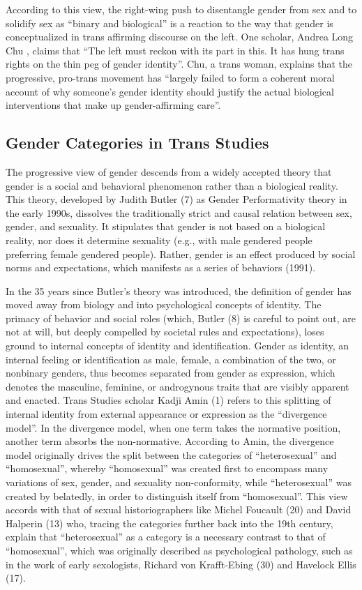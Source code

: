 \documentclass[11pt]{article}
\begin{document}
According to this view, the right-wing push to disentangle gender from sex and to solidify sex as “binary and biological” is a reaction to the way that gender is conceptualized in trans affirming discourse on the left. One scholar, Andrea Long Chu \citet{chu:2024}, claims that “The left must reckon with its part in this. It has hung trans rights on the thin peg of gender identity”. Chu, a trans woman, explains that the progressive, pro-trans movement has “largely failed to form a coherent moral account of why someone’s gender identity should justify the actual biological interventions that make up gender-affirming care”.

\subsection{Gender Categories in Trans Studies}
The progressive view of gender descends from a widely accepted theory that gender is a social and behavioral phenomenon rather than a biological reality. This theory, developed by Judith Butler (7) as Gender Performativity theory in the early 1990s, dissolves the traditionally strict and causal relation between sex, gender, and sexuality. It stipulates that gender is not based on a biological reality, nor does it determine sexuality (e.g., with male gendered people preferring female gendered people). Rather, gender is an effect produced by social norms and expectations, which manifests as a series of behaviors (1991).

In the 35 years since Butler’s theory was introduced, the definition of gender has moved away from biology and into psychological concepts of identity. The primacy of behavior and social roles (which, Butler (8) is careful to point out, are not at will, but deeply compelled by societal rules and expectations), loses ground to internal concepts of identity and identification. Gender as identity, an internal feeling or identification as male, female, a combination of the two, or nonbinary genders, thus becomes separated from gender as expression, which denotes the masculine, feminine, or androgynous traits that are visibly apparent and enacted. Trans Studies scholar Kadji Amin (1) refers to this splitting of internal identity from external appearance or expression as the “divergence model”.  In the divergence model, when one term takes the normative position, another term absorbs the non-normative. According to Amin, the divergence model originally drives the split between the categories of “heterosexual” and “homosexual”, whereby “homosexual” was created first to encompass many variations of sex, gender, and sexuality non-conformity, while “heterosexual” was created by belatedly, in order to distinguish itself from “homosexual”. This view accords with that of sexual historiographers like Michel Foucault (20) and David Halperin (13) who, tracing the categories further back into the 19th century, explain that “heterosexual” as a category is a necessary contrast to that of “homosexual”, which was originally described as psychological pathology, such as in the work of early sexologists, Richard von Krafft-Ebing (30) and Havelock Ellis (17).
\end{document}
